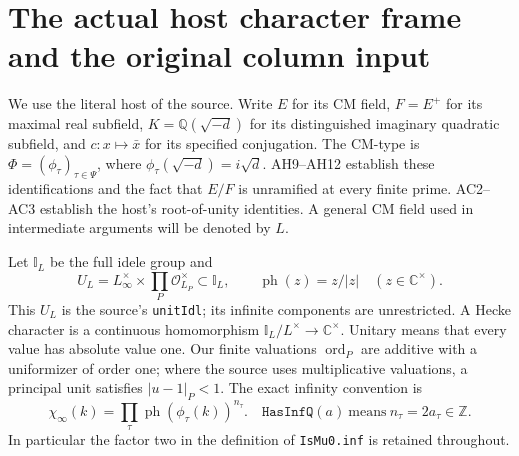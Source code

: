 \section{The actual host character frame and the original column input}
\label{sec:host-character-frame}


We use the literal host of the source. Write $E$ for its CM field,
$F=E^+$ for its maximal real subfield, $K=\mathbb Q(\sqrt{-d})$
for its distinguished imaginary quadratic subfield, and
$c:x\mapsto\bar x$ for its specified conjugation. The CM-type is
$\Phi=(\phi_\tau)_{\tau\in\Psi}$, where
$\phi_\tau(\sqrt{-d})=i\sqrt d$. AH9--AH12 establish these
identifications and the fact that $E/F$ is unramified at every
finite prime. AC2--AC3 establish the host's root-of-unity
identities. A general CM field used in intermediate arguments
will be denoted by $L$.

Let $\mathbb I_L$ be the full idele group and
\[
 U_L=L_\infty^\times\times\prod_P\mathcal O_{L_P}^{\times}
       \subset\mathbb I_L,\qquad
 \operatorname{ph}(z)=z/|z|\quad(z\in\mathbb C^\times).
 \tag{HF.1}
\]
This $U_L$ is the source's \texttt{unitIdl}; its infinite
components are unrestricted. A Hecke character is a continuous
homomorphism $\mathbb I_L/L^\times\to\mathbb C^\times$.
Unitary means that every value has absolute value one.
Our finite valuations $\operatorname{ord}_P$ are additive with a
uniformizer of order one; where the source uses multiplicative
valuations, a principal unit satisfies $|u-1|_P<1$.
The exact infinity convention is
\[
 \chi_\infty(k)=\prod_\tau
       \operatorname{ph}(\phi_\tau(k))^{n_\tau}.
 \quad
 \texttt{HasInfQ}(a)\ \text{means}\ n_\tau=2a_\tau\in\mathbb Z.
 \tag{HF.2}
\]
In particular the factor two in the definition of
\texttt{IsMu0.inf} is retained throughout.

